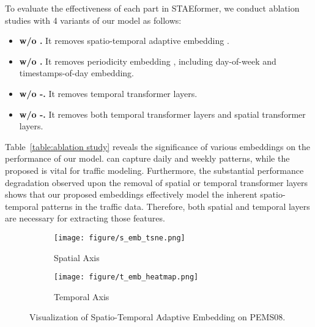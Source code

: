 \documentclass[sigconf]{acmart}
\begin{document}
To evaluate the effectiveness of each part in STAEformer, we conduct ablation studies with 4 variants of our model as follows:
\begin{itemize}


    \item 
    \textbf{w/o .}
    It removes spatio-temporal adaptive embedding . 
    
    \item 
    \textbf{w/o .}
    It removes periodicity embedding , including day-of-week and timestamps-of-day embedding.
    
    \item 
    \textbf{w/o -.}
    It removes temporal transformer layers.

    \item 
    \textbf{w/o -.}
    It removes both temporal transformer layers and spatial transformer layers.
    
\end{itemize}
Table~\ref{table:ablation study} reveals the significance of various embeddings on the performance of our model.  can capture daily and weekly patterns, while the proposed  is vital for traffic modeling. Furthermore, the substantial performance degradation observed upon the removal of spatial or temporal transformer layers shows that our proposed embeddings effectively model the inherent spatio-temporal patterns in the traffic data. Therefore, both spatial and temporal layers are necessary for extracting those features.

\begin{figure}[!t]
    \centering
    \begin{subfigure}[t]{0.55\linewidth}
        \centering
        \texttt{[image: figure/s\_emb\_tsne.png]}
        \caption{Spatial Axis}
        \label{fig: vis-s-emb}
    \end{subfigure}
    \begin{subfigure}[t]{0.44\linewidth}
        \centering
        \texttt{[image: figure/t\_emb\_heatmap.png]}
        \caption{Temporal Axis}
        \label{fig: vis-t-emb}
    \end{subfigure}
    \caption{Visualization of Spatio-Temporal Adaptive Embedding  on PEMS08.}
    \label{fig: vis}
\end{figure}
\end{document}
